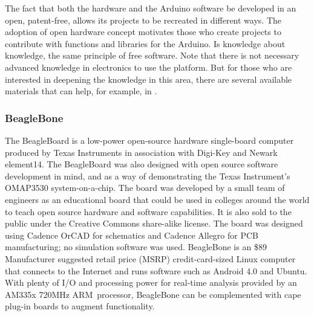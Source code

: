 \documentclass{acm_proc_article-sp}
\begin{document}
The fact that both the hardware and the Arduino software be developed in an open, patent-free, allows its projects to be recreated in different ways. The adoption of open hardware concept motivates those who create projects to contribute with functions and libraries for the Arduino. Is knowledge about knowledge, the same principle of free software.
\newline
\newline
Note that there is not necessary advanced knowledge in electronics to use the platform. But for those who are interested in deepening the knowledge in this area, there are several available materials that can help, for example, in \cite{Eletronica}.

\subsubsection{BeagleBone}
The BeagleBoard is a low-power open-source hardware single-board computer produced by Texas Instruments in association with Digi-Key and Newark element14. The BeagleBoard was also designed with open source software development in mind, and as a way of demonstrating the Texas Instrument's OMAP3530 system-on-a-chip\cite{coley2009take}. The board was developed by a small team of engineers as an educational board that could be used in colleges around the world to teach open source hardware and software capabilities. It is also sold to the public under the Creative Commons share-alike license. The board was designed using Cadence OrCAD for schematics and Cadence Allegro for PCB manufacturing; no simulation software was used.
\newline
\newline
BeagleBone is an \$89 Manufacturer suggested retail price (MSRP) credit-card-sized Linux computer that connects to the Internet and runs software such as Android 4.0 and Ubuntu. With plenty of I/O and processing power for real-time analysis provided by an AM335x 720MHz ARM\textregistered\, processor, BeagleBone can be complemented with cape plug-in boards to augment functionality.
\end{document}
